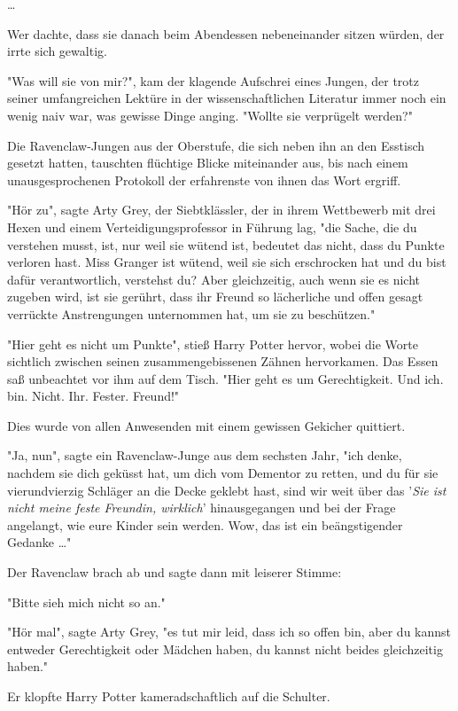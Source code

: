 {…

Wer dachte, dass sie danach beim Abendessen nebeneinander sitzen würden, der irrte sich gewaltig.

"Was will sie von mir?", kam der klagende Aufschrei eines Jungen, der trotz seiner umfangreichen Lektüre in der wissenschaftlichen Literatur immer noch ein wenig naiv war, was gewisse Dinge anging. "Wollte sie verprügelt werden?"

Die Ravenclaw-Jungen aus der Oberstufe, die sich neben ihn an den Esstisch gesetzt hatten, tauschten flüchtige Blicke miteinander aus, bis nach einem unausgesprochenen Protokoll der erfahrenste von ihnen das Wort ergriff.

"Hör zu", sagte Arty Grey, der Siebtklässler, der in ihrem Wettbewerb mit drei Hexen und einem Verteidigungsprofessor in Führung lag, "die Sache, die du verstehen musst, ist, nur weil sie wütend ist, bedeutet das nicht, dass du Punkte verloren hast. Miss Granger ist wütend, weil sie sich erschrocken hat und du bist dafür verantwortlich, verstehst du? Aber gleichzeitig, auch wenn sie es nicht zugeben wird, ist sie gerührt, dass ihr Freund so lächerliche und offen gesagt verrückte Anstrengungen unternommen hat, um sie zu beschützen."

"Hier geht es nicht um Punkte", stieß Harry Potter hervor, wobei die Worte sichtlich zwischen seinen zusammengebissenen Zähnen hervorkamen. Das Essen saß unbeachtet vor ihm auf dem Tisch. "Hier geht es um Gerechtigkeit. Und ich. bin. Nicht. Ihr. Fester. Freund!"

Dies wurde von allen Anwesenden mit einem gewissen Gekicher quittiert.

"Ja, nun", sagte ein Ravenclaw-Junge aus dem sechsten Jahr, "ich denke, nachdem sie dich geküsst hat, um dich vom Dementor zu retten, und du für sie vierundvierzig Schläger an die Decke geklebt hast, sind wir weit über das '\emph{Sie ist nicht meine feste Freundin, wirklich}' hinausgegangen und bei der Frage angelangt, wie eure Kinder sein werden. Wow, das ist ein beängstigender Gedanke …"

Der Ravenclaw brach ab und sagte dann mit leiserer Stimme:

"Bitte sieh mich nicht so an."

"Hör mal", sagte Arty Grey, "es tut mir leid, dass ich so offen bin, aber du kannst entweder Gerechtigkeit oder Mädchen haben, du kannst nicht beides gleichzeitig haben."

Er klopfte Harry Potter kameradschaftlich auf die Schulter.

}
